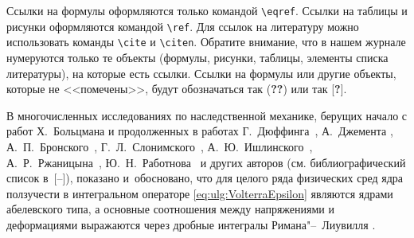 Ссылки на формулы оформляются только командой \verb"\eqref".
Ссылки на таблицы и рисунки оформляются командой \verb"\ref".
Для ссылок на литературу можно использовать команды \verb"\cite" и \verb"\citen".
Обратите внимание, что в нашем журнале нумеруются только те объекты (формулы, рисунки, таблицы, элементы списка литературы), на которые есть ссылки. 
Ссылки на формулы или другие объекты, которые не <<помечены>>, будут обозначаться так ({\bf ??}) или так [{\bf ?}].

В многочисленных исследованиях по наследственной механике, берущих начало с работ Х.~Больцмана \cite{ulg:bib:Boltzman} и продолженных в работах Г.~Дюффинга~\cite{ulg:bib:Duffing}, А.~Джемента \cite{ulg:bib:Gemant1936}, А.~П.~Бронского~\cite{ulg:bib:Bronsky}, 
Г.~Л.~Слонимского~\cite{ulg:bib:Slonimsky}, \linebreak А.~Ю.~Ишлинского~\cite{ulg:bib:Ishlinsky1940}, А.~Р.~Ржаницына~\cite{ulg:bib:Rganitsin}, 
Ю.~Н.~Работнова~\cite{ulg:bib:Rabotnov1948} и других авторов (см. библиографический список в~[--]), показано и~обосновано, что для целого ряда физических сред ядра ползучести в интегральном операторе \eqref{eq:ulg:VolterraEpsilon} являются ядрами абелевского типа, а основные соотношения между напряжениями и деформациями выражаются через дробные интегралы Римана"--~Лиувилля \cite{ulg:bib:S-K-M}.

